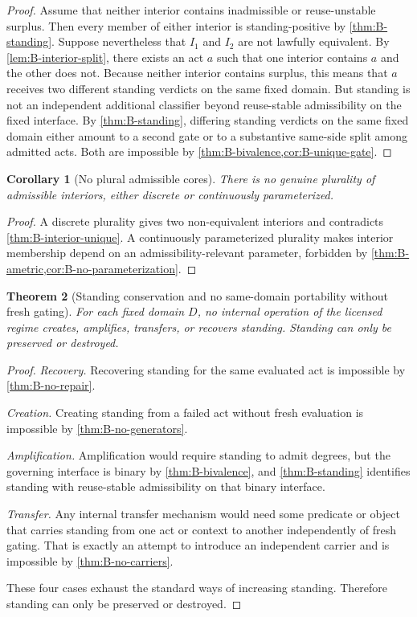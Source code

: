 \documentclass[11pt]{article}
\theoremstyle{plain}
\newtheorem{theorem}{Theorem}[section]
\newtheorem{corollary}[theorem]{Corollary}
\theoremstyle{definition}
\newcommand{\domain}{D}
\begin{document}
\begin{proof}
Assume that neither interior contains inadmissible or reuse-unstable surplus. Then every member of either interior is standing-positive by \cref{thm:B-standing}. Suppose nevertheless that $I_1$ and $I_2$ are not lawfully equivalent. By \cref{lem:B-interior-split}, there exists an act $a$ such that one interior contains $a$ and the other does not. Because neither interior contains surplus, this means that $a$ receives two different standing verdicts on the same fixed domain. But standing is not an independent additional classifier beyond reuse-stable admissibility on the fixed interface. By \cref{thm:B-standing}, differing standing verdicts on the same fixed domain either amount to a second gate or to a substantive same-side split among admitted acts. Both are impossible by \cref{thm:B-bivalence,cor:B-unique-gate}.
\end{proof}

\begin{corollary}[No plural admissible cores]
\label{cor:B-no-plural}
There is no genuine plurality of admissible interiors, either discrete or continuously parameterized.
\end{corollary}

\begin{proof}
A discrete plurality gives two non-equivalent interiors and contradicts \cref{thm:B-interior-unique}. A continuously parameterized plurality makes interior membership depend on an admissibility-relevant parameter, forbidden by \cref{thm:B-ametric,cor:B-no-parameterization}.
\end{proof}

\begin{theorem}[Standing conservation and no same-domain portability without fresh gating]
\label{thm:B-conservation}
For each fixed domain $\domain$, no internal operation of the licensed regime creates, amplifies, transfers, or recovers standing. Standing can only be preserved or destroyed.
\end{theorem}

\begin{proof}
\emph{Recovery.} Recovering standing for the same evaluated act is impossible by \cref{thm:B-no-repair}.

\emph{Creation.} Creating standing from a failed act without fresh evaluation is impossible by \cref{thm:B-no-generators}.

\emph{Amplification.} Amplification would require standing to admit degrees, but the governing interface is binary by \cref{thm:B-bivalence}, and \cref{thm:B-standing} identifies standing with reuse-stable admissibility on that binary interface.

\emph{Transfer.} Any internal transfer mechanism would need some predicate or object that carries standing from one act or context to another independently of fresh gating. That is exactly an attempt to introduce an independent carrier and is impossible by \cref{thm:B-no-carriers}.

These four cases exhaust the standard ways of increasing standing. Therefore standing can only be preserved or destroyed.
\end{proof}
\end{document}
